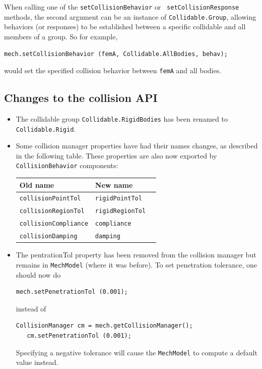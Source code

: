\documentclass{article}
\begin{document}
When calling one of the {\tt setCollisionBehavior} or {\tt
setCollisionResponse} methods, the second argument can be an instance
of {\tt Collidable.Group}, allowing behaviors (or responses) to be
established between a specific collidable and all members of a group.
So for example,
%
\begin{lstlisting}[]
   mech.setCollisionBehavior (femA, Collidable.AllBodies, behav);
\end{lstlisting}
%
would set the specified collision behavior between {\tt femA} and all
bodies.

\subsection*{Changes to the collision API}

\begin{itemize}

\item The collidable group {\tt Collidable.RigidBodies} has been
renamed to {\tt Collidable.Rigid}.

\item Some collision manager properties have had their names changes,
as described in the following table. These properties are also now
exported by {\tt CollisionBehavior} components:

\begin{tabular}{lll}
\hline
Old name & New name \\
\hline
{\tt collisionPointTol} & {\tt rigidPointTol}\\
{\tt collisionRegionTol} & {\tt rigidRegionTol}\\
{\tt collisionCompliance} & {\tt compliance}\\
{\tt collisionDamping} & {\tt damping}\\
\hline
\end{tabular}

\item The {\sf pentrationTol} property has been removed from the
collision manager but remains in {\tt MechModel} (where it was
before). To set penetration tolerance, one should now do
%
\begin{lstlisting}[]
   mech.setPenetrationTol (0.001);
\end{lstlisting}
%
instead of 
%
\begin{lstlisting}[]
   CollisionManager cm = mech.getCollisionManager();
   cm.setPenetrationTol (0.001);
\end{lstlisting}
%
Specifying a negative tolerance will cause the {\tt MechModel} to
compute a default value instead.


\end{itemize}
\end{document}
